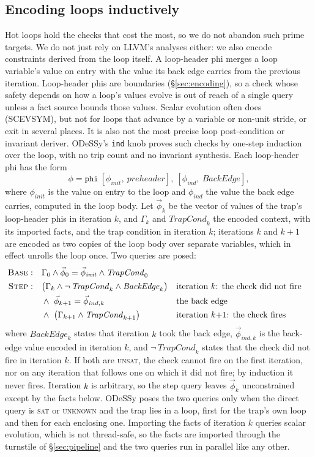 \documentclass[acmsmall,screen,nonacm]{acmart}
\newcommand{\odessy}{ODeSSy}
\newcommand{\tool}{\odessy}
\begin{document}
\subsection{Encoding loops inductively}
\label{sec:app-machinery}
Hot loops hold the checks that cost the most, so we do not abandon such prime targets. We do not just rely
on LLVM's analyses either: we also encode constraints derived from the loop
itself. A loop-header phi merges a loop variable's value on entry with the
value its back edge carries from the previous iteration. Loop-header
phis are boundaries (\S\ref{sec:encoding}), so a check
whose safety depends on how a loop's values evolve is out of reach of a
single query unless a fact source bounds those values. Scalar evolution
often does (SCEVSYM), but not for loops that advance by a variable or
non-unit stride, or exit in several places. It is also not the most precise loop post-condition or invariant deriver.  \tool{}'s \texttt{ind} knob
proves such checks by one-step induction over the loop, with no trip
count and no invariant synthesis. Each loop-header phi has the form
\[
\phi = \mathtt{phi}\ [\phi_{\mathit{init}},\ \mathit{preheader}],\ [\phi_{\mathit{ind}},\ \mathit{BackEdge}],
\]
where $\phi_{\mathit{init}}$ is the value on entry to the loop and
$\phi_{\mathit{ind}}$ the value the back edge carries, computed in the
loop body. Let $\vec\phi_k$ be the vector of values of the trap's loop-header phis
in iteration $k$, and $\Gamma_k$ and $\mathit{TrapCond}_k$ the encoded
context, with its imported facts, and the trap condition in
iteration $k$; iterations $k$ and $k{+}1$ are encoded as two copies of
the loop body over separate variables, which in effect unrolls the loop
once. Two queries are posed:
\begin{align*}
\textsc{Base}:&\quad \Gamma_0 \wedge \vec\phi_0 = \vec\phi_{\mathit{init}} \wedge \mathit{TrapCond}_0\\
\textsc{Step}:&\quad \bigl(\Gamma_k \wedge \neg\,\mathit{TrapCond}_k \wedge \mathit{BackEdge}_k\bigr)
  && \text{iteration $k$: the check did not fire}\\
&\quad\wedge\ \vec\phi_{k+1} = \vec\phi_{\mathit{ind, k}}
  && \text{the back edge}\\
&\quad\wedge\ \bigl(\Gamma_{k+1} \wedge \mathit{TrapCond}_{k+1}\bigr)
  && \text{iteration $k{+}1$: the check fires}
\end{align*}
where $\mathit{BackEdge}_k$ states that iteration $k$ took the back
edge, $\vec\phi_{\mathit{ind, k}}$ is the back-edge value encoded in iteration $k$, and
$\neg\,\mathit{TrapCond}_k$ states that the check did not fire in
iteration $k$. If both are
\textsc{unsat}, the check cannot fire on the first iteration, nor on any
iteration that follows one on which it did not fire; by induction it
never fires. Iteration $k$ is
arbitrary, so the step query leaves $\vec\phi_k$ unconstrained except by
the facts below. \tool{} poses the two queries only when the direct query is
\textsc{sat} or \textsc{unknown} and the trap lies in a loop, first for
the trap's own loop and then for each enclosing one. Importing the facts of iteration $k$ queries scalar evolution, which is
not thread-safe, so the facts are imported through the turnstile of
\S\ref{sec:pipeline} and the two queries run in parallel like any other.
\end{document}
